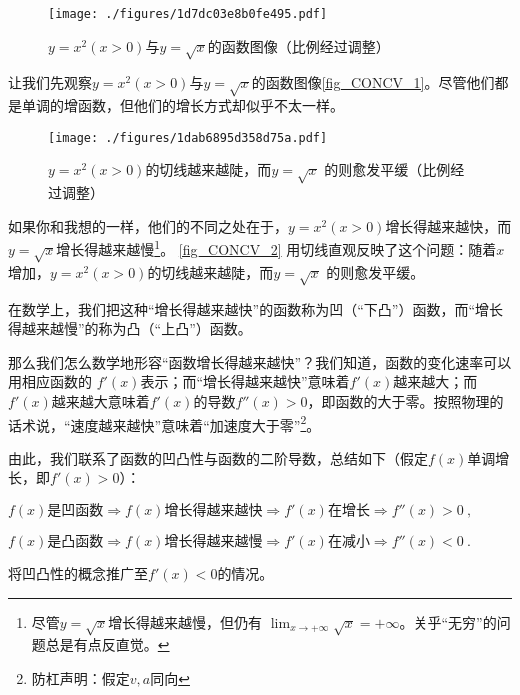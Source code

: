 

\begin{figure}[ht]
\centering
\texttt{[image: ./figures/1d7dc03e8b0fe495.pdf]}
\caption{$y=x^2 (x>0)$与$y=\sqrt{x}$的函数图像（比例经过调整）} \label{fig_CONCV_1}
\end{figure}

让我们先观察$y=x^2 (x>0)$与$y=\sqrt{x}$的函数图像\autoref{fig_CONCV_1}。尽管他们都是单调的增函数，但他们的增长方式却似乎不太一样。

\begin{figure}[ht]
\centering
\texttt{[image: ./figures/1dab6895d358d75a.pdf]}
\caption{$y=x^2 (x>0)$的切线越来越陡，而$y=\sqrt{x}$ 的则愈发平缓（比例经过调整）} \label{fig_CONCV_2}
\end{figure}

如果你和我想的一样，他们的不同之处在于，$y=x^2 (x>0)$增长得越来越快，而$y=\sqrt{x}$增长得越来越慢\footnote{尽管$y=\sqrt{x}$增长得越来越慢，但仍有 $\lim_{x\to+\infty} \sqrt{x} = +\infty$。关乎“无穷”的问题总是有点反直觉。}。
\autoref{fig_CONCV_2} 用切线直观反映了这个问题：随着$x$增加，$y=x^2 (x>0)$的切线越来越陡，而$y=\sqrt{x}$ 的则愈发平缓。

在数学上，我们把这种“增长得越来越快”的函数称为凹（“下凸”）函数，而“增长得越来越慢”的称为凸（“上凸”）函数。


那么我们怎么数学地形容“函数增长得越来越快”？我们知道，函数的变化速率可以用相应函数的 $f'(x)$表示；而“增长得越来越快”意味着$f'(x)$越来越大；而$f'(x)$越来越大意味着$f'(x)$的导数$f''(x)>0$，即函数的大于零。按照物理的话术说，“速度越来越快”意味着“加速度大于零”\footnote{防杠声明：假定$v,a$同向}。

由此，我们联系了函数的凹凸性与函数的二阶导数，总结如下（假定$f(x)$单调增长，即$f'(x)>0$）：

$f(x)\text{是凹函数} \Rightarrow f(x)\text{增长得越来越快}\Rightarrow f'(x)\text{在增长} \Rightarrow f''(x)>0~,$

$f(x)\text{是凸函数} \Rightarrow f(x)\text{增长得越来越慢}\Rightarrow f'(x)\text{在减小} \Rightarrow f''(x)<0~.$

\begin{exercise}{}
将凹凸性的概念推广至$f'(x)<0$的情况。
\end{exercise}
